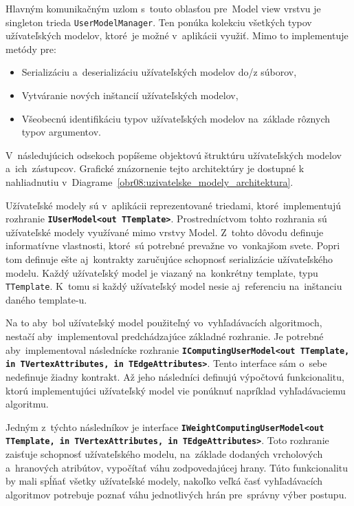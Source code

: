 Hlavným komunikačným uzlom s~touto oblasťou pre~Model view vrstvu je singleton trieda \texttt{UserModelManager}. Ten ponúka kolekciu všetkých typov užívateľských modelov, ktoré~je možné v~aplikácii využiť. Mimo to implementuje metódy pre:
\begin{itemize}
    \item Serializáciu a~deserializáciu užívateľských modelov do/z súborov,
    \item Vytváranie nových inštancií užívateľských modelov,
    \item Všeobecnú identifikáciu typov užívateľských modelov na~základe rôznych typov argumentov.
\end{itemize}

V~následujúcich odsekoch popíšeme objektovú štruktúru užívateľských modelov a~ich~zástupcov. Grafické znázornenie tejto architektúry je dostupné k nahliadnutiu v~Diagrame~\ref{obr08:uzivatelske_modely_architektura}.   

\bigskip

Užívateľské modely sú v~aplikácii reprezentované triedami, ktoré~implementujú rozhranie \textbf{\texttt{IUserModel<out TTemplate>}}.  Prostredníctvom tohto rozhrania sú užívateľské modely využívané mimo vrstvy Model. Z~tohto dôvodu definuje informatívne vlastnosti, ktoré~sú potrebné prevažne vo~vonkajšom svete. Popri tom definuje ešte aj~kontrakty zaručujúce schopnosť serializácie užívateľského modelu. Každý užívateľský model je viazaný na~konkrétny template, typu \texttt{TTemplate}. K~tomu si každý užívateľský model nesie aj~referenciu na~inštanciu daného template-u.

Na to aby~bol užívateľský model použiteľný vo~vyhľadávacích algoritmoch, nestačí aby~implementoval predchádzajúce základné rozhranie. Je potrebné aby~implementoval následnícke rozhranie \textbf{\texttt{IComputingUserModel<out TTemplate, in TVertexAttributes, in TEdgeAttributes>}}. Tento interface sám o~sebe nedefinuje žiadny kontrakt. Až jeho následníci definujú výpočtovú funkcionalitu, ktorú implementujúci užívateľský model vie ponúknuť napríklad vyhľadávaciemu algoritmu. 

Jedným z~týchto následníkov je interface \textbf{\texttt{IWeightComputingUserModel<out TTemplate, in TVertexAttributes, in TEdgeAttributes>}}. Toto rozhranie zaisťuje schopnosť užívateľského modelu, na~základe dodaných vrcholových a~hranových atribútov, vypočítať váhu zodpovedajúcej hrany. Túto funkcionalitu by mali spĺňať všetky užívateľské modely, nakoľko veľká časť vyhľadávacích algoritmov potrebuje poznať váhu jednotlivých hrán pre~správny výber postupu.

